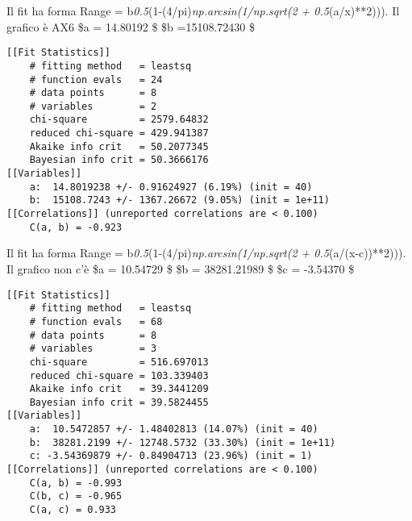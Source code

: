 Il fit ha forma Range = b\emph{0.5}(1-(4/pi)\emph{np.arcsin(1/np.sqrt(2
+ 0.5}(a/x)**2))). Il grafico è AX6 
\$a = 14.80192  \$ 
\$b =15108.72430  \$

\begin{verbatim}
[[Fit Statistics]]
    # fitting method   = leastsq
    # function evals   = 24
    # data points      = 8
    # variables        = 2
    chi-square         = 2579.64832
    reduced chi-square = 429.941387
    Akaike info crit   = 50.2077345
    Bayesian info crit = 50.3666176
[[Variables]]
    a:  14.8019238 +/- 0.91624927 (6.19%) (init = 40)
    b:  15108.7243 +/- 1367.26672 (9.05%) (init = 1e+11)
[[Correlations]] (unreported correlations are < 0.100)
    C(a, b) = -0.923 
\end{verbatim}

Il fit ha forma Range = b\emph{0.5}(1-(4/pi)\emph{np.arcsin(1/np.sqrt(2
+ 0.5}(a/(x-c))**2))). Il grafico non c'è 
\$a = 10.54729  \$
\$b = 38281.21989  \$ 
\$c = -3.54370  \$

\begin{verbatim}
[[Fit Statistics]]
    # fitting method   = leastsq
    # function evals   = 68
    # data points      = 8
    # variables        = 3
    chi-square         = 516.697013
    reduced chi-square = 103.339403
    Akaike info crit   = 39.3441209
    Bayesian info crit = 39.5824455
[[Variables]]
    a:  10.5472857 +/- 1.48402813 (14.07%) (init = 40)
    b:  38281.2199 +/- 12748.5732 (33.30%) (init = 1e+11)
    c: -3.54369879 +/- 0.84904713 (23.96%) (init = 1)
[[Correlations]] (unreported correlations are < 0.100)
    C(a, b) = -0.993
    C(b, c) = -0.965
    C(a, c) = 0.933 
\end{verbatim}
